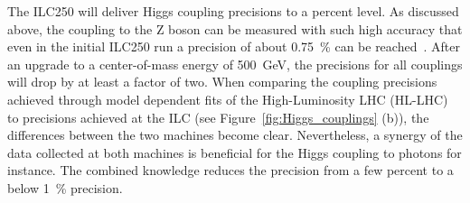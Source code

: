 The ILC250 will deliver Higgs coupling precisions to a percent level.
As discussed above, the coupling to the Z boson can be measured with such high accuracy that even in the initial ILC250 run a precision of about \SI{0.75}{\percent} can be reached~\cite[p. 6]{HiggsCouplings_Junping}.
After an upgrade to a center-of-mass energy of \SI{500}{\GeV}, the precisions for all couplings will drop by at least a factor of two.
When comparing the coupling precisions achieved through model dependent fits of the High-Luminosity LHC (HL-LHC) to precisions achieved at the ILC (see Figure~\ref{fig:Higgs_couplings} (b)), the differences between the two machines become clear.
Nevertheless, a synergy of the data collected at both machines is beneficial for the Higgs coupling to photons for instance.
The combined knowledge reduces the precision from a few percent to a below \SI{1}{\percent} precision.
